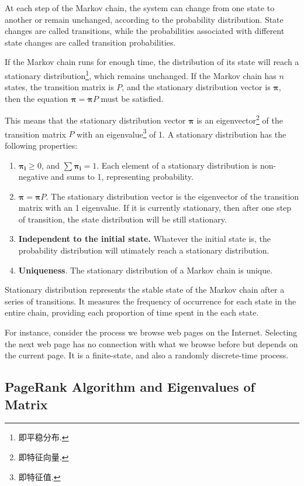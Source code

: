 \documentclass[lettersize,journal,12pt,conference]{IEEEtran}
\begin{document}
At each step of the Markov chain, the system can change from one state to another or remain unchanged, according to the probability distribution. State changes are called transitions, while the probabilities associated with different state changes are called transition probabilities.

If the Markov chain runs for enough time, the distribution of its state will reach a stationary distribution\footnote[1]{即平稳分布.}, which remains unchanged. If the Markov chain has $n$ states, the transition matrix is $P$, and the stationary distribution vector is $\boldsymbol{\pi}$, then the equation $\boldsymbol{\pi} = \boldsymbol{\pi} P$ must be satisfied.

This means that the stationary distribution vector $\boldsymbol{\pi}$ is an eigenvector\footnote[2]{即特征向量.} of the transition matrix $P$ with an eigenvalue\footnote[3]{即特征值.} of 1. A stationary distribution has the following properties:
\begin{enumerate}
	\item [1.] $\boldsymbol{\pi_i}\geq0$, and $\sum\boldsymbol{\pi_i}=1$. Each element of a stationary distribution is non-negative and sums to 1, representing probability.
	\item [2.] $\boldsymbol{\pi} = \boldsymbol{\pi} P$. The stationary distribution vector is the eigenvector of the transition matrix with an 1 eigenvalue. If it is currently stationary, then after one step of transition, the state distribution will be still stationary.
	\item [3.] \textbf{Independent to the initial state.} Whatever the initial state is, the probability distribution will utimately reach a stationary distribution.
	\item [4.] \textbf{Uniqueness}. The stationary distribution of a Markov chain is unique.
\end{enumerate}

Stationary distribution represents the stable state of the Markov chain after a series of transitions.
It measures the frequency of occurrence for each state in the entire chain, providing each proportion of time spent in the each state.

For instance, consider the process we browse web pages on the Internet. Selecting the next web page has no connection with what we browse before but depends on the current page.
It is a finite-state, and also a randomly discrete-time process.

\subsection{PageRank Algorithm and Eigenvalues of Matrix}
\end{document}
